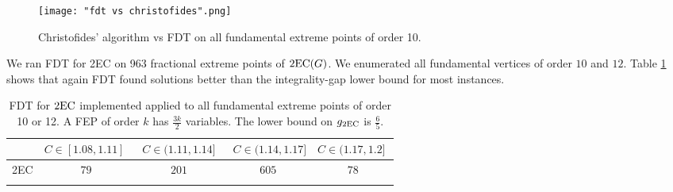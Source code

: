 \begin{figure}[h!]
	\centering
	\texttt{[image: "fdt vs christofides".png]}
	\caption{Christofides' algorithm vs FDT on all fundamental extreme points of order 10.}
	\label{fdtvschris}
\end{figure}


We ran FDT for 2EC on 963 fractional extreme points of $\operatorname{2EC}(G)$. We enumerated all fundamental vertices of order $10$ and $12$. Table \ref{table2EC} shows that again FDT found solutions better than the integrality-gap lower bound for most instances. 
\begin{table}[h!]
\begin{small}
	\centering
	  \begin{tabular}{c c c c c}
	  	\hline
	  	& $C\in [1.08,1.11]\;$ & $\;C\in (1.11,1.14]\;$ &
               $\;C\in (1.14,1.17]$ &\; $C\in (1.17,1.2]\;$ \\ \hline
	  	2EC & $79$ & $201$ & $605$ & $78$ \\ \hline\\
	  \end{tabular}	\caption{FDT for $\operatorname{2EC}$ implemented applied to all fundamental extreme points of order 10 or 12. A FEP of order $k$ has $\frac{3k}{2}$ variables. The lower bound on $g_{\operatorname{2EC}}$ is $\frac{6}{5}$.}
	  \label{table2EC}
\end{small}
\end{table}

